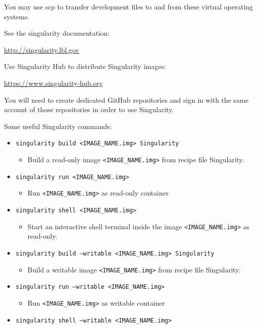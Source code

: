 \documentclass{article}
\begin{document}
You may use scp to transfer development files to and from these 
virtual operating systems.

See the singularity documentation:

\url{http://singularity.lbl.gov}

Use Singularity Hub to distribute Singularity images:

\url{https://www.singularity-hub.org}

You will need to create dedicated GitHub repositories and sign in
with the same account of those repositories in order to use 
Singularity.


Some useful Singularity commands:

\begin{itemize}
\item \texttt{singularity build <IMAGE\_NAME.img> Singularity}
    \begin{itemize}
    \item Build a read-only image \texttt{<IMAGE\_NAME.img>} from recipe file Singularity.
    \end{itemize}
\item \texttt{singularity run <IMAGE\_NAME.img>}
    \begin{itemize}
    \item Run \texttt{<IMAGE\_NAME.img>} as read-only container
    \end{itemize}
\item \texttt{singularity shell <IMAGE\_NAME.img>}
    \begin{itemize}
    \item Start an interactive shell terminal inside the image \texttt{<IMAGE\_NAME.img>} as read-only.
    \end{itemize}
\item \texttt{singularity build --writable <IMAGE\_NAME.img> Singularity}
    \begin{itemize}
    \item Build a writable image \texttt{<IMAGE\_NAME.img>} from recipe file Singularity.
    \end{itemize}
\item \texttt{singularity run --writable <IMAGE\_NAME.img>}
    \begin{itemize}
    \item Run \texttt{<IMAGE\_NAME.img>} as writable container
    \end{itemize}
\item \texttt{singularity shell --writable <IMAGE\_NAME.img>}
    \begin{itemize}

\end{itemize}
\end{itemize}
\end{document}
